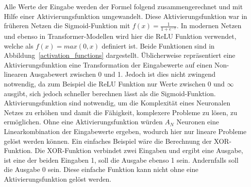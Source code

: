 Alle Werte der Eingabe werden der Formel folgend zusammengerechnet und mit Hilfe einer Aktivierungsfunktion umgewandelt.
Diese Aktivierungsfunktion war in früheren Netzen die Sigmoid-Funktion mit $f(x)=\frac{1}{1+e^{-x}}$.
In modernen Netzen und ebenso in Transformer-Modellen wird hier die ReLU Funktion verwendet, welche als $f(x)=max(0,x)$ definiert ist.
Beide Funktionen sind in Abbildung~\ref{activation_functions} dargestellt.
Üblicherweise repräsentiert eine Aktivierungsfunktion eine Transformation der Eingabewerte auf einen Non-linearen Ausgabewert zwischen 0 und 1.
Jedoch ist dies nicht zwingend notwendig, da zum Beispiel die ReLU Funktion nur Werte zwischen 0 und $\infty$ ausgibt, sich jedoch schneller berechnen lässt als die Sigmoid-Funktion.
Aktivierungsfunktion sind notwendig, um die Komplexität eines Neuronalen Netzes zu erhöhen und damit die Fähigkeit, komplexere Probleme zu lösen, zu ermöglichen.
Ohne eine Aktivierungsfunktion würden $A_N$ Neuronen eine Linearkombination der Eingabewerte ergeben, wodurch hier nur lineare Probleme gelöst werden können.
Ein einfaches Beispiel wäre die Berechnung der XOR-Funktion. Die XOR-Funktion verbindet zwei Eingaben und ergibt eine Ausgabe, ist eine der beiden Eingaben 1, soll die Ausgabe ebenso 1 sein.
Andernfalls soll die Ausgabe 0 sein. Diese einfache Funktion kann nicht ohne eine Aktivierungsfunktion gelöst werden.\\

